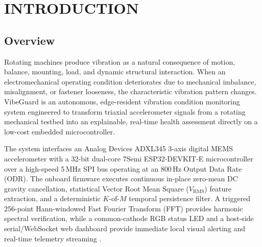 \chapter{INTRODUCTION}
\label{ch:introduction}

\section{Overview}
\hspace{2em}Rotating machines produce vibration as a natural consequence of motion, balance, mounting, load, and dynamic structural interaction. When an electromechanical operating condition deteriorates due to mechanical imbalance, misalignment, or fastener looseness, the characteristic vibration pattern changes. VibeGuard is an autonomous, edge-resident vibration condition monitoring system engineered to transform triaxial accelerometer signals from a rotating mechanical testbed into an explainable, real-time health assessment directly on a low-cost embedded microcontroller.

\hspace{2em}The system interfaces an Analog Devices ADXL345 3-axis digital MEMS accelerometer with a 32-bit dual-core 7Semi ESP32-DEVKIT-E microcontroller over a high-speed 5\,MHz SPI bus operating at an 800\,Hz Output Data Rate (ODR). The onboard firmware executes continuous in-place zero-mean DC gravity cancellation, statistical Vector Root Mean Square ($V_{\mathrm{RMS}}$) feature extraction, and a deterministic $K$-of-$M$ temporal persistence filter. A triggered 256-point Hann-windowed Fast Fourier Transform (FFT) provides harmonic spectral verification, while a common-cathode RGB status LED and a host-side serial/WebSocket web dashboard provide immediate local visual alerting and real-time telemetry streaming \cite{vibeguardprimer}.


